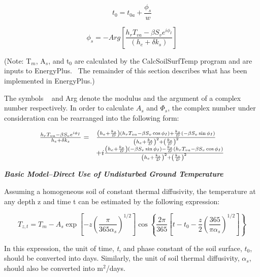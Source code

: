 \begin{equation}
{t_0} = {t_{0a}} + \frac{{{\phi_s}}}{w}
\end{equation}

\begin{equation}
{\phi_s} =  - Arg\left[ {\frac{{{h_r}{T_{va}} - \beta {S_v}{e^{i{\phi_I}}}}}{{\left( {{h_e} + \delta {k_s}} \right)}}} \right]
\end{equation}

(Note: T\(_{m}\), A\(_{s}\), and t\(_{0}\) are calculated by the CalcSoilSurfTemp program and are inputs to EnergyPlus.~ The remainder of this section describes what has been implemented in EnergyPlus.)

The symbols \textbar{}\textbar{}~ \textbar{}\textbar{} and Arg denote the modulus and the argument of a complex number respectively. In order to calculate \(A_s\) and \(\Phi_s\), the complex number under consideration can be rearranged into the following form:

\begin{equation}
  \begin{array}{rl}
    \frac{h_r T_{va} - \beta S_v e^{i \phi_I}}{h_e + \delta k_s}
           =&  \frac{ \left(h_e + \frac{k_s}{D}\right) \left( h_r T_{va} - \beta S_v \cos \phi_I\right) + \frac{k_s}{D} \left(-\beta S_v \sin \phi_I\right)}{\left(h_e + \frac{k_s}{D}\right)^2 + \left(\frac{k_s}{D}\right)^2} \\
           &+ i\frac{ \left(h_e + \frac{k_s}{D}\right) \left(-\beta S_v \sin \phi_I\right) - \frac{k_s}{D} \left(h_r T_{va} - \beta S_v \cos \phi_I\right)}{\left(h_e + \frac{k_s}{D}\right)^2 + \left(\frac{k_s}{D}\right)^2}
  \end{array}
\end{equation}

\emph{\textbf{Basic Model--Direct Use of Undisturbed Ground Temperature}}

Assuming a homogeneous soil of constant thermal diffusivity, the temperature at any depth z and time t can be estimated by the following expression:

\begin{equation}
{T_{z,t}} = {T_m} - {A_s}\exp \left[ { - z{{\left( {\frac{\pi }{{{\mathrm{365}}{\alpha_s}}}} \right)}^{1/2}}} \right]\cos \left\{ {\frac{{2\pi }}{{{\mathrm{365}}}}\left[ {t - {t_0} - \frac{z}{2}{{\left( {\frac{{{\mathrm{365}}}}{{\pi {\alpha_s}}}} \right)}^{1/2}}} \right]} \right\}
\end{equation}

In this expression, the unit of time, \emph{t}, and phase constant of the soil surface, \(t_{0}\), should be converted into days. Similarly, the unit of soil thermal diffusivity, \({\alpha_{s}}\), should also be converted into m\(^{2}\)/days.

